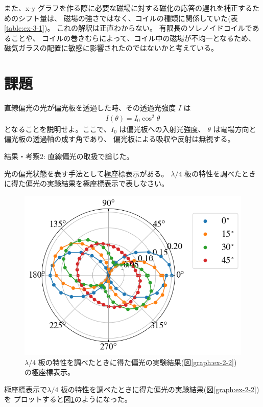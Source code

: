 \documentclass[9pt,dvipdfmx,a4paper]{jsarticle}
\begin{document}
また、x-y グラフを作る際に必要な磁場に対する磁化の応答の遅れを補正するためのシフト量は、
磁場の強さではなく、コイルの種類に関係していた(表\ref{table:ex-3-1})。
これの解釈は正直わからない。
有限長のソレノイドコイルであることや、
コイルの巻きむらによって、コイル中の磁場が不均一となるため、
磁気ガラスの配置に敏感に影響されたのではないかと考えている。

\section{課題}
\begin{tcolorbox}[colbacktitle=white, coltitle=black, colback=white, title = 課題1]
    直線偏光の光が偏光板を透過した時、その透過光強度 \(I\) は
    \begin{align*}
        I(\theta) = I_0 \cos^2\theta
    \end{align*}
    となることを説明せよ。ここで、\(I_0\) は偏光板への入射光強度、
    \(\theta\) は電場方向と偏光板の透過軸の成す角であり、
    偏光板による吸収や反射は無視する。
\end{tcolorbox}

結果・考察2: 直線偏光の取扱で論じた。\\
\clearpage
\begin{tcolorbox}[colbacktitle=white, coltitle=black, colback=white, title = 課題2]
    光の偏光状態を表す手法として極座標表示がある。
    \(\lambda/4\) 板の特性を調べたときに得た偏光の実験結果を極座標表示で表しなさい。
\end{tcolorbox}
\begin{figure}
    \centering
    \includegraphics[width = 0.45 \columnwidth]{11_29_04.png}
    \caption{\(\lambda/4\) 板の特性を調べたときに得た偏光の実験結果(図\ref{graph:ex-2-2})の極座標表示。}
    \label{graph:ex-2-3}
\end{figure}
極座標表示で\(\lambda/4\) 板の特性を調べたときに得た偏光の実験結果(図\ref{graph:ex-2-2})を
プロットすると図\ref{graph:ex-2-3}のようになった。
\end{document}
